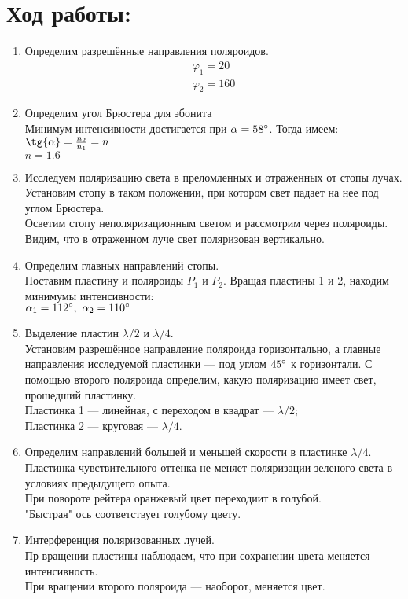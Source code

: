\section*{Ход работы:}
\begin{enumerate}
    \item Определим разрешённые направления поляроидов.
    \begin{align*}
        \varphi_1 = 20 \\
        \varphi_2 = 160
    \end{align*}
    
    \item Определим угол Брюстера для эбонита \\
    Минимум интенсивности достигается при $\alpha = 58\degree$. Тогда имеем:
    $\tg{\alpha} = \frac{n_2}{n_1} = n$ \\
    $n = 1.6$
    
    \item Исследуем поляризацию света в преломленных и отраженных от стопы лучах. \\
    Установим стопу в таком положении, при котором свет падает на нее под углом Брюстера. \\
    Осветим стопу неполяризационным светом и рассмотрим через поляроиды. \\
    Видим, что в отраженном луче свет поляризован вертикально.
    
    \item Определим главных направлений стопы. \\
    Поставим пластину и поляроиды $P_1$ и $P_2$. Вращая пластины 1 и 2, находим минимумы интенсивности: \\
    $\alpha_1 = 112\degree,\ \alpha_2 = 110\degree$
    
    \item Выделение пластин $\lambda / 2$ и $\lambda / 4$. \\
    Установим разрешённое направление поляроида горизонтально, а главные направления исследуемой пластинки 
    — под углом $45\degree$ к горизонтали. С помощью второго поляроида определим, какую поляризацию имеет свет, прошедший пластинку. \\
    Пластинка 1 --- линейная, с переходом в квадрат --- $\lambda / 2$; \\
    Пластинка 2 --- круговая --- $\lambda / 4$.
    
    \item Определим направлений большей и меньшей скорости в пластинке $\lambda / 4$. \\
    Пластинка чувствительного оттенка не меняет поляризации зеленого света в условиях предыдущего опыта. \\
    При повороте рейтера оранжевый цвет переходиит в голубой. \\
    "Быстрая" ось соответствует голубому цвету.
    
    \item Интерференция поляризованных лучей. \\
    Пр вращении пластины наблюдаем, что при сохранении цвета меняется интенсивность. \\
    При вращении второго поляроида --- наоборот, меняется цвет.
    
\end{enumerate}